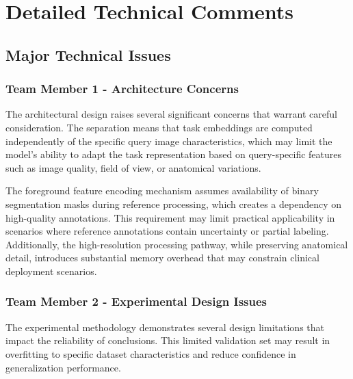 \section{Detailed Technical Comments}
\label{sec:detailed_comments}

\subsection{Major Technical Issues}
\subsubsection{Team Member 1 - Architecture Concerns}
The architectural design raises several significant concerns that warrant careful consideration.  The separation means that task embeddings are computed independently of the specific query image characteristics, which may limit the model's ability to adapt the task representation based on query-specific features such as image quality, field of view, or anatomical variations.

The foreground feature encoding mechanism assumes availability of binary segmentation masks during reference processing, which creates a dependency on high-quality annotations. This requirement may limit practical applicability in scenarios where reference annotations contain uncertainty or partial labeling. Additionally, the high-resolution processing pathway, while preserving anatomical detail, introduces substantial memory overhead that may constrain clinical deployment scenarios.

\subsubsection{Team Member 2 - Experimental Design Issues}
The experimental methodology demonstrates several design limitations that impact the reliability of conclusions.  This limited validation set may result in overfitting to specific dataset characteristics and reduce confidence in generalization performance.

